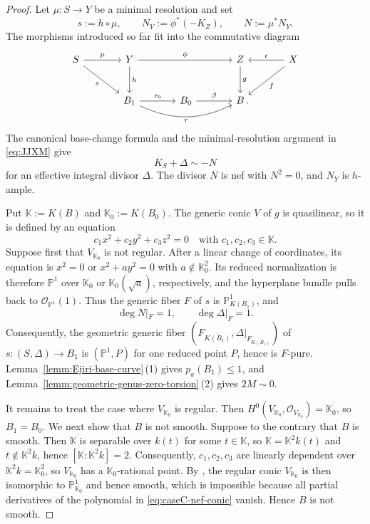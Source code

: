 \documentclass[10pt,abstract=true]{scrartcl}
\numberwithin{equation}{section}
\theoremstyle{definition}
\theoremstyle{remark}
\begin{document}
\begin{proof}
  Let $\mu\colon S\to Y$ be a minimal resolution and set
  \[
    s:=h\circ\mu,
    \qquad N_Y:=\phi^*(-K_Z),
    \qquad N:=\mu^*N_Y.
  \]
  The morphisms introduced so far fit into the commutative diagram
  \[
    \begin{tikzcd}[column sep=large,row sep=large]
      S \ar[r,"\mu"] \ar[dr,"s"'] & Y \ar[rr,"\phi"] \ar[d,"h"] & & Z \ar[d,"g"] & X \ar[l,"\epsilon"'] \ar[dl,"f"] \\
      & B_1 \ar[r,"\tau_0"] \ar[rr,bend right=25,"\tau"'] & B_0 \ar[r,"\beta"] & B\rlap{\,.} &
    \end{tikzcd}
  \]
  The canonical base-change formula and the minimal-resolution argument in \eqref{eq:JJXM} give
  \[
    K_S+\Delta\sim-N
  \]
  for an effective integral divisor $\Delta$.
  The divisor $N$ is nef with $N^2=0$, and $N_Y$ is $h$-ample.

  Put $\mathbb K:=K(B)$ and $\mathbb K_0:=K(B_0)$.
  The generic conic $V$ of $g$ is quasilinear, so it is defined by an equation
  \begin{equation}\label{eq:caseC-nef-conic}
    c_1x^2+c_2y^2+c_3z^2=0 \quad\text{with }c_1,c_2,c_3\in\mathbb K.
  \end{equation}
  Suppose first that $V_{\mathbb K_0}$ is not regular.
  After a linear change of coordinates, its equation is $x^2=0$ or $x^2+a y^2=0$ with $a\notin \mathbb K_0^2$.
  Its reduced normalization is therefore $\mathbb P^1$ over $\mathbb K_0$ or $\mathbb K_0(\sqrt a)$, respectively, and the hyperplane bundle pulls back to $\mathcal O_{\mathbb P^1}(1)$.
  Thus the generic fiber $F$ of $s$ is $\mathbb P^1_{K(B_1)}$, and
  \[
    \deg N|_F=1,
    \qquad \deg\Delta|_F=1.
  \]
  Consequently, the geometric generic fiber $(F_{\overline{K(B_1)}},\Delta|_{F_{\overline{K(B_1)}}})$ of $s\colon(S,\Delta)\to B_1$ is $(\mathbb P^1,P)$ for one reduced point $P$, hence is $F$-pure.
  Lemma~\ref{lemm:Ejiri-base-curve}\,\textup{(1)} gives $p_a(B_1)\le1$, and Lemma~\ref{lemm:geometric-genus-zero-torsion}\,\textup{(2)} gives $2M\sim0$.

  It remains to treat the case where $V_{\mathbb K_0}$ is regular.
  Then $H^0(V_{\mathbb K_0},\mathcal O_{V_{\mathbb K_0}})=\mathbb K_0$, so $B_1=B_0$.
  We next show that $B$ is not smooth.
  Suppose to the contrary that $B$ is smooth.
  Then $\mathbb K$ is separable over $k(t)$ for some $t\in\mathbb K$, so $\mathbb K=\mathbb K^2k(t)$ and $t\notin\mathbb K^2k$, hence $[\mathbb K:\mathbb K^2k]=2$.
  Consequently, $c_1,c_2,c_3$ are linearly dependent over $\mathbb K^2k=\mathbb K_0^2$, so $V_{\mathbb K_0}$ has a $\mathbb K_0$-rational point.
  By \cite[Theorem~9.10\,(3)]{tanaka_invariants_2021}, the regular conic $V_{\mathbb K_0}$ is then isomorphic to $\mathbb P^1_{\mathbb K_0}$ and hence smooth, which is impossible because all partial derivatives of the polynomial in \eqref{eq:caseC-nef-conic} vanish.
  Hence $B$ is not smooth.


\end{proof}
\end{document}
